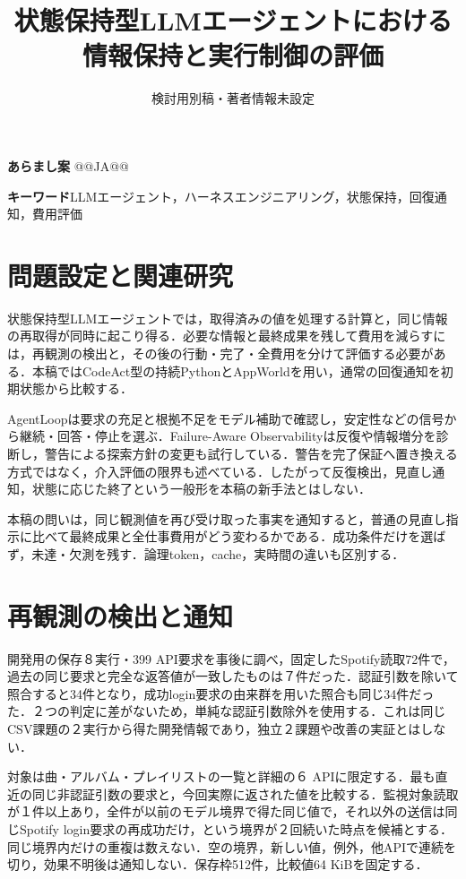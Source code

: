 \documentclass[uplatex,a4paper,twocolumn,10pt]{jsarticle}
\title{状態保持型LLMエージェントにおける\newline 情報保持と実行制御の評価}
\author{検討用別稿・著者情報未設定}
\date{}
\begin{document}
\raggedbottom
\maketitle
\noindent\textbf{あらまし案}\quad
@@JA@@

\noindent\textbf{キーワード}\quad LLMエージェント，ハーネスエンジニアリング，状態保持，回復通知，費用評価

\section{問題設定と関連研究}
状態保持型LLMエージェントでは，取得済みの値を処理する計算と，同じ情報の再取得が同時に起こり得る．必要な情報と最終成果を残して費用を減らすには，再観測の検出と，その後の行動・完了・全費用を分けて評価する必要がある．本稿ではCodeAct\cite{codeact}型の持続PythonとAppWorld\cite{appworld}を用い，通常の回復通知を初期状態から比較する．

AgentLoop\cite{agentloop}は要求の充足と根拠不足をモデル補助で確認し，安定性などの信号から継続・回答・停止を選ぶ．Failure-Aware Observability\cite{observability}は反復や情報増分を診断し，警告による探索方針の変更も試行している．警告を完了保証へ置き換える方式ではなく，介入評価の限界も述べている．したがって反復検出，見直し通知，状態に応じた終了という一般形を本稿の新手法とはしない．

本稿の問いは，同じ観測値を再び受け取った事実を通知すると，普通の見直し指示に比べて最終成果と全仕事費用がどう変わるかである．成功条件だけを選ばず，未達・欠測を残す．論理token，cache，実時間の違い\cite{costproxy}も区別する．

\section{再観測の検出と通知}
開発用の保存８実行・399 API要求を事後に調べ，固定したSpotify読取72件で，過去の同じ要求と完全な返答値が一致したものは７件だった．認証引数を除いて照合すると34件となり，成功login要求の由来群を用いた照合も同じ34件だった．２つの判定に差がないため，単純な認証引数除外を使用する．これは同じCSV課題の２実行から得た開発情報であり，独立２課題や改善の実証とはしない．

対象は曲・アルバム・プレイリストの一覧と詳細の６ APIに限定する．最も直近の同じ非認証引数の要求と，今回実際に返された値を比較する．監視対象読取が１件以上あり，全件が以前のモデル境界で得た同じ値で，それ以外の送信は同じSpotify login要求の再成功だけ，という境界が２回続いた時点を候補とする．同じ境界内だけの重複は数えない．空の境界，新しい値，例外，他APIで連続を切り，効果不明後は通知しない．保存枠512件，比較値64 KiBを固定する．
\end{document}
